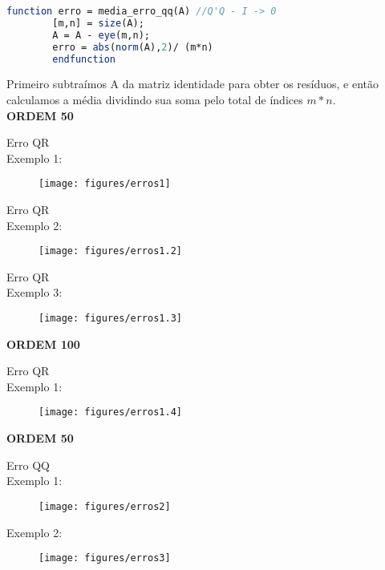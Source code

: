 \documentclass[leqno]{article}
\numberwithin{equation}{section}
\begin{document}
	\begin{lstlisting}[style=mystyle, language=Scilab]
		function erro = media_erro_qq(A) //Q'Q - I -> 0
		[m,n] = size(A);
		A = A - eye(m,n);
		erro = abs(norm(A),2)/ (m*n)
		endfunction
	\end{lstlisting}
	
	Primeiro subtraímos A da matriz identidade para obter os resíduos, e então calculamos a média dividindo sua soma pelo total de índices $m*n$.\\
	
	\noindent \textbf{{\large ORDEM 50}}
	
	
	\noindent Erro QR\\ \noindent Exemplo 1:	
	\begin{figure}[H]
		\centering
		\texttt{[image: figures/erros1]}		
	\end{figure}

	\noindent Erro QR\\ \noindent Exemplo 2:
	\begin{figure}[H]
		\centering
		\texttt{[image: figures/erros1.2]}		
	\end{figure}

	\noindent Erro QR\\ \noindent Exemplo 3:
	\begin{figure}[H]
		\centering
		\texttt{[image: figures/erros1.3]}		
	\end{figure}

	\noindent \textbf{{\large ORDEM 100}}
	
	
	\noindent Erro QR\\ \noindent Exemplo 1:
	\begin{figure}[H]
		\centering
		\texttt{[image: figures/erros1.4]}		
	\end{figure}

	\newpage
	\noindent \textbf{{\large ORDEM 50}}

	
	\noindent Erro QQ\\ \noindent Exemplo 1:
	\begin{figure}[H]
		\centering
		\texttt{[image: figures/erros2]}		
	\end{figure}	

	\noindent Exemplo 2:

	\begin{figure}[H]
		\centering
		\texttt{[image: figures/erros3]}		
	\end{figure}
\end{document}
